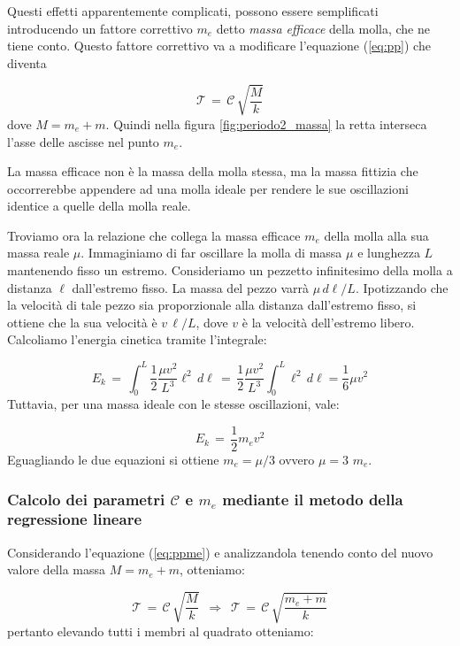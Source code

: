 Questi effetti apparentemente complicati, possono essere semplificati introducendo un fattore correttivo $m_e$ detto
\emph{massa efficace} della molla, che ne tiene conto. Questo fattore correttivo va a modificare l'equazione (\ref{eq:pp}) che diventa

\begin{equation}
    \mathcal{T} \, = \, \mathcal{C} \, \sqrt{\frac{M}{k}}
    \label{eq:ppme}
\end{equation}
%
dove $M = m_e + m$. Quindi nella figura \ref{fig:periodo2_massa} la retta interseca
l'asse delle ascisse nel punto $m_e$.

La massa efficace non è la massa della molla stessa, ma la massa fittizia che occorrerebbe
appendere ad una molla ideale per rendere le sue oscillazioni identice a quelle della molla reale.

Troviamo ora la relazione che collega la massa efficace $m_e$ della molla alla sua massa reale $\mu$.
Immaginiamo di far oscillare la molla di massa $\mu$ e lunghezza $L$ mantenendo fisso un estremo.
Consideriamo un pezzetto infinitesimo della molla a distanza $\ell$ dall'estremo fisso. La massa del pezzo
varrà $\mu \, d\ell / L$. Ipotizzando che la velocità di tale pezzo sia proporzionale alla distanza dall'estremo
fisso, si ottiene che la sua velocità è $v \, \ell / L$, dove $v$ è la velocità dell'estremo libero.
Calcoliamo l'energia cinetica tramite l'integrale:

\begin{equation*}
    E_k \, = \, \int_0^L \frac{1}{2} \frac{\mu v^2}{L^3} \ell^2 \, d\ell \, = \,
    \frac{1}{2} \frac{\mu v^2}{L^3} \int_0^L \ell^2 \, d\ell = \frac{1}{6} \mu v^2
\end{equation*}
%
Tuttavia, per una massa ideale con le stesse oscillazioni, vale:

\begin{equation*}
    E_k \, = \, \frac{1}{2} m_e v^2
\end{equation*}
%
Eguagliando le due equazioni si ottiene $m_e = \mu/3$ ovvero $\mu = 3\,\,m_e$. 

\subsubsection{Calcolo dei parametri $\mathcal{C}$ e $m_e$ mediante il metodo della regressione lineare}
Considerando l'equazione (\ref{eq:ppme}) e analizzandola tenendo conto del nuovo valore della massa $M = m_e + m$, otteniamo:

\begin{equation*}
	\mathcal{T} \,=\, \mathcal{C} \, \sqrt{\frac{M}{k}}	\,\,\,\Longrightarrow\,\,\, \mathcal{T} \,=\, \mathcal{C} \, \sqrt{\frac{m_e + m}{k}}
\end{equation*}
%
pertanto elevando tutti i membri al quadrato otteniamo:

